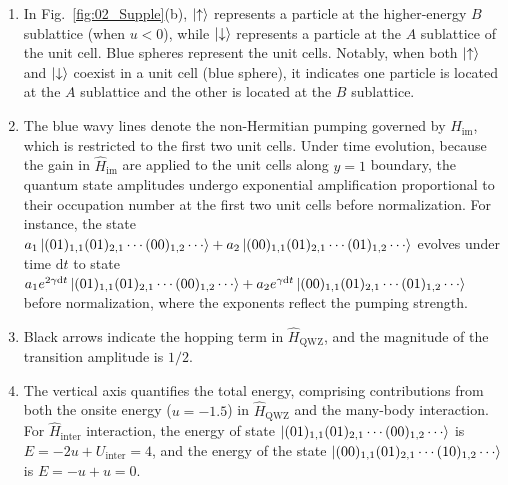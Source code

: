 \documentclass[longbibliography, aps, prx, amsmath, amssymb, amsfonts, twocolumn,superscriptaddress, footinbib]{revtex4-1}
\begin{document}
	\begin{enumerate}
		\item In Fig.~\ref{fig:02_Supple}(b), $\ket{\uparrow}$ represents a particle at the higher-energy $B$ sublattice (when $u<0$), while $\ket{\downarrow}$ represents a particle at the $A$ sublattice of the unit cell. 
		Blue spheres represent the unit cells. 
		Notably, when both $\ket{\uparrow}$ and $\ket{\downarrow}$ coexist in a unit cell (blue sphere), it indicates one particle is located at the $A$ sublattice and the other is located at the $B$ sublattice. 
		\item The blue wavy lines denote the non-Hermitian pumping governed by $\hat{H}_{\text{im}}$, which is restricted to the first two unit cells. Under time evolution, because the gain in $\hat{H}_{\text{im}}$ are applied to the unit cells along $y=1$ boundary, the quantum state amplitudes undergo exponential amplification proportional to their occupation number at the first two unit cells before normalization. For instance, the state $a_1 \ket{(01)_{1,1}(01)_{2,1}\cdots(00)_{1,2}\cdots} + a_2\ket{(00)_{1,1}(01)_{2,1}\cdots(01)_{1,2}\cdots}$ evolves under time $\mathrm{d}t$ to state $a_1 e^{2\gamma \mathrm{d}t} \ket{(01)_{1,1}(01)_{2,1}\cdots(00)_{1,2}\cdots} + a_2 e^{\gamma \mathrm{d}t} \ket{(00)_{1,1}(01)_{2,1}\cdots(01)_{1,2}\cdots}$ before normalization, where the exponents reflect the pumping strength. 
		\item Black arrows indicate the hopping term in $\hat{H}_{\text{QWZ}}$, and the magnitude of the transition amplitude is $1/2$. 
		\item The vertical axis quantifies the total energy, comprising contributions from both the onsite energy ($u=-1.5$) in $\hat{H}_{\text{QWZ}}$ and the many-body interaction. For $\hat{H}_{\text{inter}}$ interaction, the energy of state $\ket{(01)_{1,1}(01)_{2,1}\cdots(00)_{1,2}\cdots}$ is $E=-2u+U_{\text{inter}}=4$, and the energy of the state $\ket{(00)_{1,1}(01)_{2,1}\cdots(10)_{1,2}\cdots}$ is $E=-u+u=0$. 
	\end{enumerate}
\end{document}
